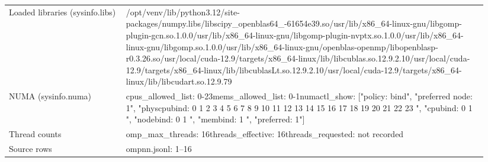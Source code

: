 \begin{longtable}{>{\raggedright\arraybackslash}p{0.23\linewidth}>{\raggedright\arraybackslash}p{0.71\linewidth}}
Loaded libraries (sysinfo.libs) & /\allowbreak{}opt/\allowbreak{}venv/\allowbreak{}lib/\allowbreak{}python3.12/\allowbreak{}site-packages/\allowbreak{}numpy.libs/\allowbreak{}libscipy\_\allowbreak{}openblas64\_\allowbreak{}-61654e39.so\newline /\allowbreak{}usr/\allowbreak{}lib/\allowbreak{}x86\_\allowbreak{}64-linux-gnu/\allowbreak{}libgomp-plugin-gcn.so.1.0.0\newline /\allowbreak{}usr/\allowbreak{}lib/\allowbreak{}x86\_\allowbreak{}64-linux-gnu/\allowbreak{}libgomp-plugin-nvptx.so.1.0.0\newline /\allowbreak{}usr/\allowbreak{}lib/\allowbreak{}x86\_\allowbreak{}64-linux-gnu/\allowbreak{}libgomp.so.1.0.0\newline /\allowbreak{}usr/\allowbreak{}lib/\allowbreak{}x86\_\allowbreak{}64-linux-gnu/\allowbreak{}openblas-openmp/\allowbreak{}libopenblasp-r0.3.26.so\newline /\allowbreak{}usr/\allowbreak{}local/\allowbreak{}cuda-12.9/\allowbreak{}targets/\allowbreak{}x86\_\allowbreak{}64-linux/\allowbreak{}lib/\allowbreak{}libcublas.so.12.9.2.10\newline /\allowbreak{}usr/\allowbreak{}local/\allowbreak{}cuda-12.9/\allowbreak{}targets/\allowbreak{}x86\_\allowbreak{}64-linux/\allowbreak{}lib/\allowbreak{}libcublasLt.so.12.9.2.10\newline /\allowbreak{}usr/\allowbreak{}local/\allowbreak{}cuda-12.9/\allowbreak{}targets/\allowbreak{}x86\_\allowbreak{}64-linux/\allowbreak{}lib/\allowbreak{}libcudart.so.12.9.79 \\
NUMA (sysinfo.numa) & cpus\_\allowbreak{}allowed\_\allowbreak{}list: 0-23\newline mems\_\allowbreak{}allowed\_\allowbreak{}list: 0-1\newline numactl\_\allowbreak{}show: ["policy: bind", "preferred node: 1", "physcpubind: 0 1 2 3 4 5 6 7 8 9 10 11 12 13 14 15 16 17 18 19 20 21 22 23 ", "cpubind: 0 1 ", "nodebind: 0 1 ", "membind: 1 ", "preferred: 1"] \\
Thread counts & omp\_\allowbreak{}max\_\allowbreak{}threads: 16\newline threads\_\allowbreak{}effective: 16\newline threads\_\allowbreak{}requested: not recorded \\
Source rows & ompnn.jsonl: 1–16 \\
\end{longtable}
